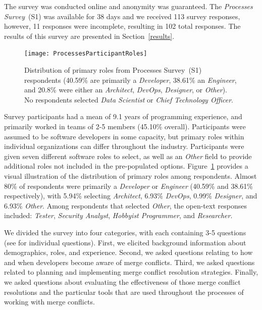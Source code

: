 The survey was conducted online and anonymity was guaranteed.
The \textit{Processes Survey}~(S1) was available for 38 days and we received 113 survey responses, however, 11 responses were incomplete, resulting in 102 total responses.
The results of this survey are presented in Section~\ref{results}.

\begin{figure}[!htbp]
\centering
\texttt{[image: ProcessesParticipantRoles]}
\caption{Distribution of primary roles from Processes Survey~(S1) respondents (40.59\% are primarily a \textit{Developer}, 38.61\% an \textit{Engineer}, and 20.8\% were either an \textit{Architect}, \textit{DevOps}, \textit{Designer}, or \textit{Other}). No respondents selected \textit{Data Scientist} or \textit{Chief Technology Officer}.}
\label{processes_roles}
\end{figure}

Survey participants had a mean of 9.1 years of programming experience, and primarily worked in teams of 2-5 members (45.10\% overall).
Participants were assumed to be software developers in some capacity, but primary roles within individual organizations can differ throughout the industry.
Participants were given seven different software roles to select, as well as an \textit{Other} field to provide additional roles not included in the pre-populated options.
Figure~\ref{processes_roles} provides a visual illustration of the distribution of primary roles among respondents.
Almost 80\% of respondents were primarily a \textit{Developer} or \textit{Engineer} (40.59\% and 38.61\% respectively), with 5.94\% selecting \textit{Architect}, 6.93\% \textit{DevOps}, 0.99\% \textit{Designer}, and 6.93\% \textit{Other}.
Among respondents that selected \textit{Other}, the open-text responses included: \textit{Tester}, \textit{Security Analyst}, \textit{Hobbyist Programmer}, and \textit{Researcher}.

We divided the survey into four categories, with each containing 3-5 questions (see \cite{companion_site} for individual questions).
First, we elicited background information about demographics, roles, and experience.
Second, we asked questions relating to how and when developers become aware of merge conflicts.
Third, we asked questions related to planning and implementing merge conflict resolution strategies.
Finally, we asked questions about evaluating the effectiveness of those merge conflict resolutions and the particular tools that are used throughout the processes of working with merge conflicts.

